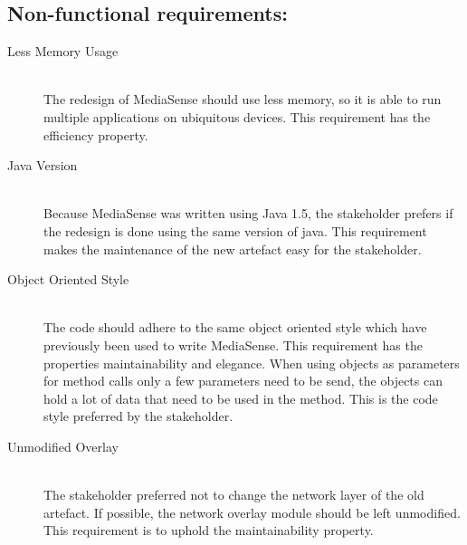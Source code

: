 \subsection{Non-functional requirements:}
\begin{description}
	\item[Less Memory Usage] \hfill \\
	The redesign of MediaSense should use less memory, so it is able to run multiple applications on ubiquitous devices. This requirement has the efficiency property.

	\item[Java Version] \hfill \\
	Because MediaSense was written using Java 1.5, the stakeholder prefers if the redesign is done using the same version of java. This requirement makes the maintenance of the new artefact easy for the stakeholder. 
	
	\item[Object Oriented Style] \hfill \\
	The code should adhere to the same object oriented style which have previously been used to write MediaSense. This requirement has the properties maintainability and elegance. When using objects as parameters for method calls only a few parameters need to be send, the objects can hold a lot of data that need to be used in the method. This is the code style preferred by the stakeholder. 
	
	\item[Unmodified Overlay] \hfill \\
	The stakeholder preferred not to change the network layer of the old artefact. If possible, the network overlay module should be left unmodified. This requirement is to uphold the maintainability property.
\end{description}	


